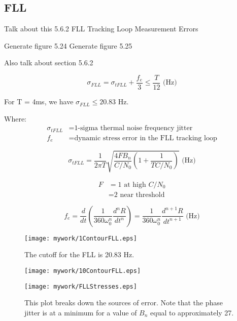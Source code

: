 \subsection{FLL}


Talk about this
5.6.2 FLL Tracking Loop Measurement Errors

Generate figure 5.24
Generate figure 5.25

Also talk about section 5.6.2

\begin{equation}
\sigma_{FLL} =  \sigma_{tFLL} + \frac{f_e}{3} \leq \frac{T}{12} \text{ (Hz)}
\end{equation}

For T = 4ms, we have $\sigma_{FLL} \leq 20.83$ Hz.


Where:
\begin{align*}
\sigma_{tFLL} &= \text{1-sigma thermal noise frequency jitter}\\
f_e &= \text{dynamic stress error in the FLL tracking loop}
\end{align*}


\begin{equation}
\sigma_{tFLL} = \frac{1}{2 \pi T} \sqrt{ \frac{4FB_n}{C/N_0}(1 + \frac{1}{TC/N_0})} \text{ (Hz)}
\end{equation}

\begin{align*}
F &= \text{1 at high } C/N_0\\
  &= \text{2 near threshold}
\end{align*}


\begin{equation}
f_e = \frac{d}{dt}(\frac{1}{360 \omega^n_0}\frac{d^nR}{dt^n}) = \frac{1}{360\omega^n_0} \frac{d^{n+1}R}{dt^{n+1}} \text{ (Hz)}
\end{equation}


\begin{figure}[!htb] 
    \centering
    \texttt{[image: mywork/1ContourFLL.eps]} 
    \caption{The cutoff for the FLL is 20.83 Hz.}
\end{figure}

\begin{figure}[!htb] 
    \centering
    \texttt{[image: mywork/10ContourFLL.eps]} 
    \caption{}
\end{figure}



\begin{figure}[!htb] 
    \centering
    \texttt{[image: mywork/FLLStresses.eps]} 
    \caption{This plot breaks down the sources of error. Note that the phase jitter is at a minimum for a value of $B_n$ equal to approximately 27.}
\end{figure}




